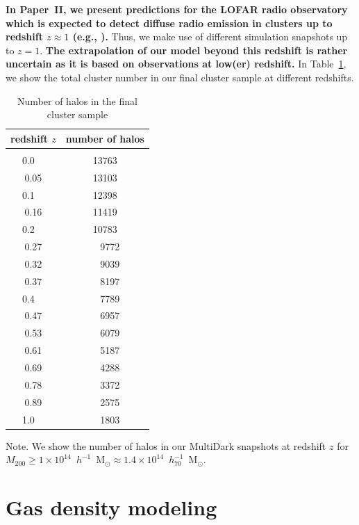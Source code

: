 \documentclass[useAMS,usenatbib]{mn2e}
\begin{document}
{\bf In Paper~II, we present predictions for the LOFAR radio observatory
which is expected to detect diffuse radio emission in clusters up to redshift $z \approx 1$ (e.g.,
\citealp{2012JApA..tmp...34R}).} Thus, we make use of different simulation snapshots up to $z=1$. 
{\bf The extrapolation of our model beyond this redshift is rather uncertain as it is based
on observations at low(er) redshift.} In Table~\ref{tab:z}, we show the total cluster number in 
our final cluster sample at different redshifts.

\begin{table} 
\begin{center}
\caption{Number of halos in the final cluster sample}
\medskip
\begin{tabular}{cc}
\hline
\phantom{\Big|}
redshift $z$ & number of halos \\
\hline\\[-0.5em]
 0.0~~ &  13763\\
 0.05 &  13103\\
 0.1~~ &  12398\\
 0.16 & 11419\\
 0.2~~ &  10783\\ 
 0.27 & ~~9772\\
 0.32 & ~~9039\\
 0.37 & ~~8197\\
 0.4~~ &   ~~7789\\
 0.47 & ~~6957\\
 0.53 & ~~6079\\ 
 0.61 &  ~~5187\\ 
 0.69 & ~~4288\\
 0.78 &  ~~3372\\ 
 0.89 & ~~2575\\
 1.0~~ &  ~~1803\\[0.5em]
\hline
\end{tabular}
\label{tab:z}
\end{center}
\footnotesize{Note. We show the number of halos in our MultiDark snapshots at redshift $z$ for $M_{200}\geq1\times10^{14}$~$h^{-1}$~M$_{\odot}\approx1.4\times10^{14}$~$h_{70}^{-1}$~M$_{\odot}$. }
\end{table}


\section{Gas density modeling}
\label{sec:3}
\end{document}
